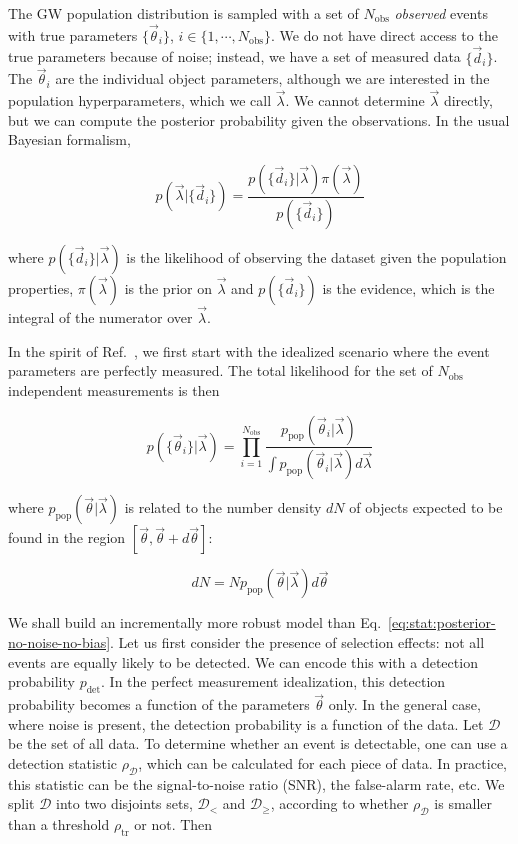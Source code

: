 \documentclass[%
preprint,
 amsmath,amssymb,
 aps,
]{revtex4-2}
\newcommand{\given}[2]{p( #1 | #2 )}
\newcommand{\ppop}[0]{p_{\text{pop}}}
\newcommand{\pdet}[0]{p_{\text{det}}}
\newcommand{\nobs}[0]{N_{\text{obs}}}
\begin{document}
The GW population distribution is sampled with a set of $\nobs$ \textit{observed} events with true
parameters $\{ \vec{\theta}_i \}$, $i \in \{1, \cdots, \nobs\}$. We do not have direct access to
the true parameters because of noise; instead, we have a set of measured data $\{ \vec{d}_i \}$.
The $\vec{\theta}_i$ are the individual object parameters, although we are interested in the
population hyperparameters, which we call $\vec{\lambda}$. We cannot determine $\vec{\lambda}$
directly, but we can compute the posterior probability given the observations. In the usual
Bayesian formalism,

\begin{equation}
	\given{\vec{\lambda}}{\{\vec{d}_i \}} =
	\frac{\given{\{\vec{d}_i \}}{\vec{\lambda}} \pi(\vec{\lambda})}{p(\{\vec{d}_i \})}
\end{equation}

where $\given{\{\vec{d}_i \}}{\vec{\lambda}}$ is the likelihood of observing the dataset given the
population properties, $\pi(\vec{\lambda})$ is the prior on $\vec{\lambda}$ and $p(\{\vec{d}_i \})$
is the evidence, which is the integral of the numerator over $\vec{\lambda}$.

In the spirit of Ref.~, we first start with the idealized scenario where
the event parameters are perfectly measured. The total likelihood for the set of $\nobs$
independent measurements is then

\begin{equation}
	\label{eq:stat:posterior-no-noise-no-bias}
	\given{\{ \vec{\theta}_i \}}{\vec{\lambda}} =
	\prod_{i=1}^{\nobs} \frac{\ppop(\vec{\theta}_i | \vec{\lambda})}{\int \ppop(\vec{\theta}_i | \vec{\lambda}) d\vec{\lambda}}
\end{equation}

where $\ppop(\vec{\theta} | \vec{\lambda})$ is related to the number density $dN$ of objects
expected to be found in the region $[\vec{\theta}, \vec{\theta} + d\vec{\theta}]$:

\begin{equation}
	\label{eq:stat:ppop}
	dN = N \ppop(\vec{\theta} | \vec{\lambda}) d\vec{\theta}
\end{equation}

We shall build an incrementally more robust model than
Eq.~\eqref{eq:stat:posterior-no-noise-no-bias}. Let us first consider the presence of selection
effects: not all events are equally likely to be detected. We can encode this with a detection
probability $\pdet$. In the perfect measurement idealization, this detection probability becomes a
function of the parameters $\vec{\theta}$ only. In the general case, where noise is present, the
detection probability is a function of the data. Let $\mathcal{D}$ be the set of all data. To
determine whether an event is detectable, one can use a detection statistic $\rho_{\mathcal{D}}$,
which can be calculated for each piece of data. In practice, this statistic can be the
signal-to-noise ratio (SNR), the false-alarm rate, etc. We split $\mathcal{D}$ into two disjoints
sets, $\mathcal{D}_<$ and $\mathcal{D}_\geq$, according to whether $\rho_\mathcal{D}$ is smaller
than a threshold $\rho_{\text{tr}}$ or not. Then
\end{document}
